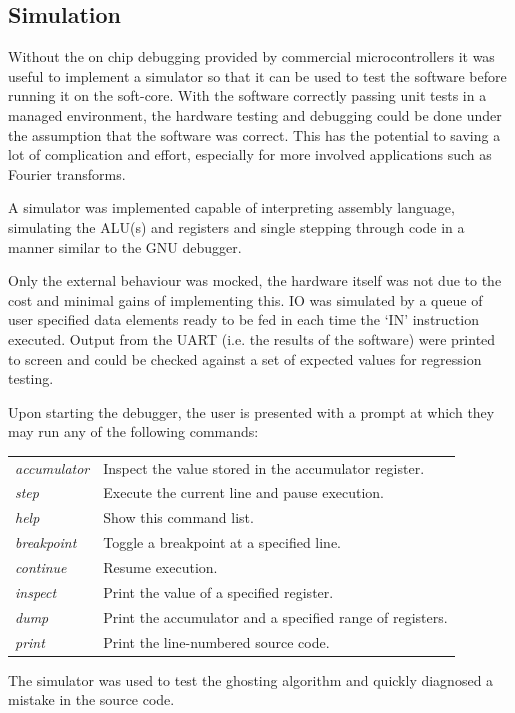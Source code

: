 \subsection{Simulation}
 Without the on chip debugging provided by commercial microcontrollers it was
 useful to implement a simulator so that it can be used to test the software before 
 running it on the soft-core. With the software correctly passing unit tests in a managed
 environment, the hardware testing and debugging could be done under the
 assumption that the software was correct. This has the potential to saving a lot
 of complication and effort, especially for more involved applications such as
 Fourier transforms.

 A simulator was implemented capable of interpreting assembly language,
 simulating the ALU(s) and registers and single stepping through code in a
 manner similar to the GNU debugger.

 Only the external behaviour was mocked, the hardware itself was not due to the
 cost and minimal gains of implementing this. IO was simulated by a queue of
 user specified data elements ready to be fed in each time the `IN' instruction
 executed. Output from the UART (i.e. the results of the software) were printed to
 screen and could be checked against a set of expected values for regression
 testing.

 Upon starting the debugger, the user is presented with a prompt at which they
 may run any of the following commands:

 \vspace{5pt}
 \begin{tabularx}{\linewidth}{lX}
    \hline
    \emph{accumulator} & Inspect the value stored in the accumulator register.  \\
    \emph{step} & Execute the current line and pause execution. \\
    \emph{help} & Show this command list. \\
    \emph{breakpoint} & Toggle a breakpoint at a specified line. \\
    \emph{continue} & Resume execution. \\
    \emph{inspect} & Print the value of a specified register. \\
    \emph{dump} & Print the accumulator and a specified range of registers. \\
    \emph{print} & Print the line-numbered source code. \\
    \hline
 \end{tabularx}
 \vspace{5pt}

 The simulator was used to test the ghosting algorithm and quickly diagnosed a
 mistake in the source code.
